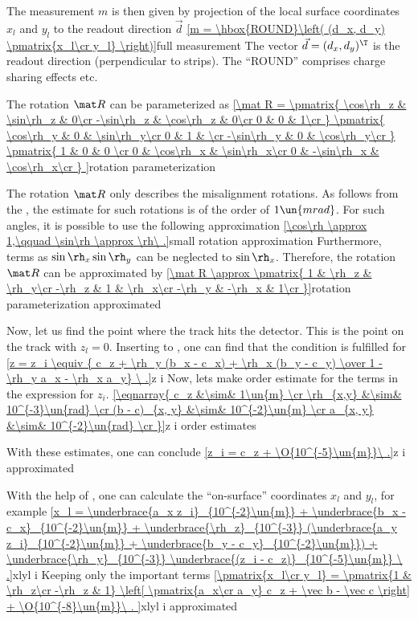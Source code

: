 The measurement $m$ is then given by projection of the local surface coordinates $x_l$ and $y_l$ to the readout direction $\vec d$
\eqref{m = \hbox{ROUND}\left( (d_x, d_y) \pmatrix{x_l\cr y_l} \right)}{full measurement}
The vector $\vec d = (d_x, d_y)^\T$ is the readout direction (perpendicular to strips). The ``ROUND'' comprises charge sharing effects etc.

The rotation $\mat R$ can be parameterized as
\eqref{\mat R =
\pmatrix{
\cos\rh_z  & \sin\rh_z & 0\cr
-\sin\rh_z & \cos\rh_z & 0\cr
0		   & 0         & 1\cr
}
\pmatrix{
\cos\rh_y  & 0 & \sin\rh_y\cr
0		   & 1 &          \cr
-\sin\rh_y & 0 & \cos\rh_y\cr
}
\pmatrix{
1 & 0		   & 0        \cr
0 & \cos\rh_x  & \sin\rh_x\cr
0 & -\sin\rh_x & \cos\rh_x\cr
}
}{rotation parameterization}

\TODO{} The rotation $\mat R$ only describes the misalignment rotations. As follows from the , the estimate for such rotations is of the order of $1\un{mrad}$. For such angles, it is possible to use the following approximation
\eqref{\cos\rh \approx 1,\qquad \sin\rh \approx \rh\ .}{small rotation approximation}
Furthermore, terms as $\sin\rh_x \sin\rh_y$ can be neglected to $\sin\rh_x$. Therefore, the rotation $\mat R$ can be approximated by
\eqref{\mat R \approx \pmatrix{
1 & \rh_z & \rh_y\cr
-\rh_z & 1 & \rh_x\cr
-\rh_y & -\rh_x & 1\cr
}}{rotation parameterization approximated}


Now, let us find the point where the track  hits the detector. This is the point on the track with $z_l = 0$. Inserting  to , one can find that the condition is fulfilled for 
\eqref{z = z_i \equiv { c_z + \rh_y (b_x - c_x) + \rh_x (b_y - c_y) \over 1 - \rh_y a_x - \rh_x a_y} \ .}{z i}
Now, lets make order estimate for the terms in the expression for $z_i$.\hfil\break
\eqref{\eqnarray{
c_z &\sim& 1\un{m} \cr
\rh_{x,y} &\sim& 10^{-3}\un{rad} \cr
(b - c)_{x, y} &\sim& 10^{-2}\un{m} \cr
a_{x, y} &\sim& 10^{-2}\un{rad} \cr
}}{z i order estimates}

With these estimates, one can conclude
\eqref{z_i = c_z + \O{10^{-5}\un{m}}\ .}{z i approximated}

With the help of , one can calculate the ``on-surface'' coordinates $x_l$ and $y_l$, for example
\eqref{x_l = 
\underbrace{a_x z_i}_{10^{-2}\un{m}}
+ \underbrace{b_x - c_x}_{10^{-2}\un{m}} 
+ \underbrace{\rh_z}_{10^{-3}} (\underbrace{a_y z_i}_{10^{-2}\un{m}} + \underbrace{b_y - c_y}_{10^{-2}\un{m}})
+ \underbrace{\rh_y}_{10^{-3}} \underbrace{(z_i - c_z)}_{10^{-5}\un{m}}
\ .}{xlyl i}
Keeping only the important terms
\eqref{\pmatrix{x_l\cr y_l} = \pmatrix{1 & \rh_z\cr -\rh_z & 1}
\left[
\pmatrix{a_x\cr a_y} c_z + \vec b - \vec c
\right] + \O{10^{-8}\un{m}}\ .
}{xlyl i approximated}

